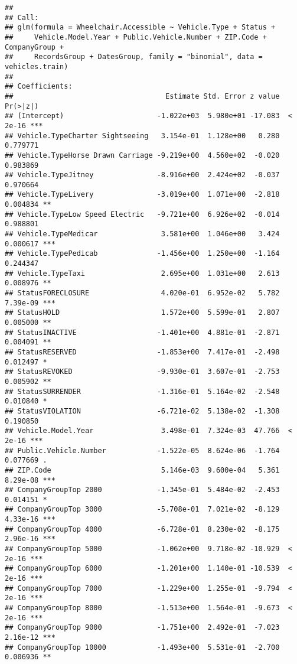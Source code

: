 \documentclass[
]{article}
\begin{document}
\begin{verbatim}
## 
## Call:
## glm(formula = Wheelchair.Accessible ~ Vehicle.Type + Status + 
##     Vehicle.Model.Year + Public.Vehicle.Number + ZIP.Code + CompanyGroup + 
##     RecordsGroup + DatesGroup, family = "binomial", data = vehicles.train)
## 
## Coefficients:
##                                    Estimate Std. Error z value Pr(>|z|)    
## (Intercept)                      -1.022e+03  5.980e+01 -17.083  < 2e-16 ***
## Vehicle.TypeCharter Sightseeing   3.154e-01  1.128e+00   0.280 0.779771    
## Vehicle.TypeHorse Drawn Carriage -9.219e+00  4.560e+02  -0.020 0.983869    
## Vehicle.TypeJitney               -8.916e+00  2.424e+02  -0.037 0.970664    
## Vehicle.TypeLivery               -3.019e+00  1.071e+00  -2.818 0.004834 ** 
## Vehicle.TypeLow Speed Electric   -9.721e+00  6.926e+02  -0.014 0.988801    
## Vehicle.TypeMedicar               3.581e+00  1.046e+00   3.424 0.000617 ***
## Vehicle.TypePedicab              -1.456e+00  1.250e+00  -1.164 0.244347    
## Vehicle.TypeTaxi                  2.695e+00  1.031e+00   2.613 0.008976 ** 
## StatusFORECLOSURE                 4.020e-01  6.952e-02   5.782 7.39e-09 ***
## StatusHOLD                        1.572e+00  5.599e-01   2.807 0.005000 ** 
## StatusINACTIVE                   -1.401e+00  4.881e-01  -2.871 0.004091 ** 
## StatusRESERVED                   -1.853e+00  7.417e-01  -2.498 0.012497 *  
## StatusREVOKED                    -9.930e-01  3.607e-01  -2.753 0.005902 ** 
## StatusSURRENDER                  -1.316e-01  5.164e-02  -2.548 0.010840 *  
## StatusVIOLATION                  -6.721e-02  5.138e-02  -1.308 0.190850    
## Vehicle.Model.Year                3.498e-01  7.324e-03  47.766  < 2e-16 ***
## Public.Vehicle.Number            -1.522e-05  8.624e-06  -1.764 0.077669 .  
## ZIP.Code                          5.146e-03  9.600e-04   5.361 8.29e-08 ***
## CompanyGroupTop 2000             -1.345e-01  5.484e-02  -2.453 0.014151 *  
## CompanyGroupTop 3000             -5.708e-01  7.021e-02  -8.129 4.33e-16 ***
## CompanyGroupTop 4000             -6.728e-01  8.230e-02  -8.175 2.96e-16 ***
## CompanyGroupTop 5000             -1.062e+00  9.718e-02 -10.929  < 2e-16 ***
## CompanyGroupTop 6000             -1.201e+00  1.140e-01 -10.539  < 2e-16 ***
## CompanyGroupTop 7000             -1.229e+00  1.255e-01  -9.794  < 2e-16 ***
## CompanyGroupTop 8000             -1.513e+00  1.564e-01  -9.673  < 2e-16 ***
## CompanyGroupTop 9000             -1.751e+00  2.492e-01  -7.023 2.16e-12 ***
## CompanyGroupTop 10000            -1.493e+00  5.531e-01  -2.700 0.006936 ** 

\end{verbatim}
\end{document}
